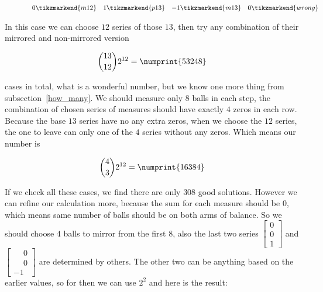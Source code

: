 \documentclass[11pt]{article} %
\begin{document}
\begin{figure}[h]
\[\begin{array}{rrrrrrrrr}
 0 \tikzmarkend{m12} &
 1 \tikzmarkend{p13} &
-1 \tikzmarkend{m13} &
 0 \tikzmarkend{wrong}
\end{array}
\]
\end{figure}

In this case we can choose $12$ series of those $13$, then try any combination of their mirrored and non-mirrored version

\[ \binom{13}{12} 2^{12} = \numprint{53248} \]

cases in total, what is a wonderful number, but we know one more thing from subsection~\ref{how_many}. We should measure only $8$ balls in each step, the combination of chosen series of measures should have exactly $4$ zeros in each row. Because the base $13$ series have no any extra zeros, when we choose the $12$ series, the one to leave can only one of the $4$ series without any zeros. Which means our number is

\[ \binom{4}{3} 2^{12} = \numprint{16384} \]

If we check all these cases, we find there are only $308$ good solutions. However we can refine our calculation more, because the sum for each measure should be $0$, which means same number of balls should be on both arms of balance. So we should choose $4$ balls to mirror from the first $8$, also the last two series $\left[\begin{smallmatrix}0\\0\\1\end{smallmatrix}\right]$ and $\left[\begin{smallmatrix}\phantom{{}-{}}0\\\phantom{{}-{}}0\\-1\end{smallmatrix}\right]$ are determined by others. The other two can be anything based on the earlier values, so for then we can use $2^2$ and here is the result:
\end{document}
